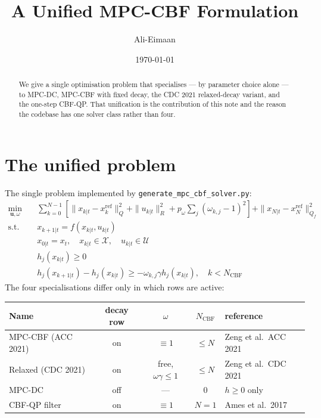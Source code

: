 \documentclass[11pt]{article}
\title{A Unified MPC-CBF Formulation}
\author{Ali-Eimaan}
\date{\today}
\begin{document}
\maketitle

\begin{abstract}
We give a single optimisation problem that specialises --- by parameter choice alone --- to MPC-DC,
MPC-CBF with fixed decay, the CDC 2021 relaxed-decay variant, and the one-step CBF-QP. That
unification is the contribution of this note and the reason the codebase has one solver class
rather than four.
\end{abstract}

\section{The unified problem}
The single problem implemented by \texttt{generate\_mpc\_cbf\_solver.py}:
\begin{align*}
\min_{\mathbf{u}, \omega} \quad & \sum_{k=0}^{N-1} \left[ \|x_{k|t} - x^{\mathrm{ref}}_{k}\|_Q^2 + \|u_{k|t}\|_R^2 + p_\omega \sum_j (\omega_{k,j} - 1)^2 \right] + \|x_{N|t} - x^{\mathrm{ref}}_N\|_{Q_f}^2 \\
\text{s.t.}\quad & x_{k+1|t} = f(x_{k|t}, u_{k|t}) \\
 & x_{0|t} = x_t,\quad x_{k|t} \in \mathcal{X},\quad u_{k|t} \in \mathcal{U} \\
 & h_j(x_{k|t}) \ge 0 \\
 & h_j(x_{k+1|t}) - h_j(x_{k|t}) \ge -\omega_{k,j}\gamma h_j(x_{k|t}),\quad k < N_{\mathrm{CBF}}
\end{align*}
The four specialisations differ only in which rows are active:
\begin{center}
\begin{tabular}{lcccl}
\hline
Name & decay row & $\omega$ & $N_{\mathrm{CBF}}$ & reference \\
\hline
MPC-CBF (ACC 2021) & on & $\equiv 1$ & $\le N$ & Zeng et al.\ ACC 2021 \\
Relaxed (CDC 2021)  & on & free, $\omega\gamma \le 1$ & $\le N$ & Zeng et al.\ CDC 2021 \\
MPC-DC              & off & --- & $0$ & $h \ge 0$ only \\
CBF-QP filter       & on & $\equiv 1$ & $N = 1$ & Ames et al.\ 2017 \\
\hline
\end{tabular}
\end{center}
\end{document}
